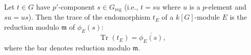 Let $t \in G$ have $p'$-component $s \in G_{\text{reg}}$ (i.e., $t = su$ where $u$ is a $p$-element and $su = us$). Then the trace of the endomorphism $t_E$ of a $k[G]$-module $E$ is the reduction modulo $\mathfrak{m}$ of $\phi_E(s)$:
$$\operatorname{Tr}(t_E) = \overline{\phi_E(s)},$$
where the bar denotes reduction modulo $\mathfrak{m}$.
